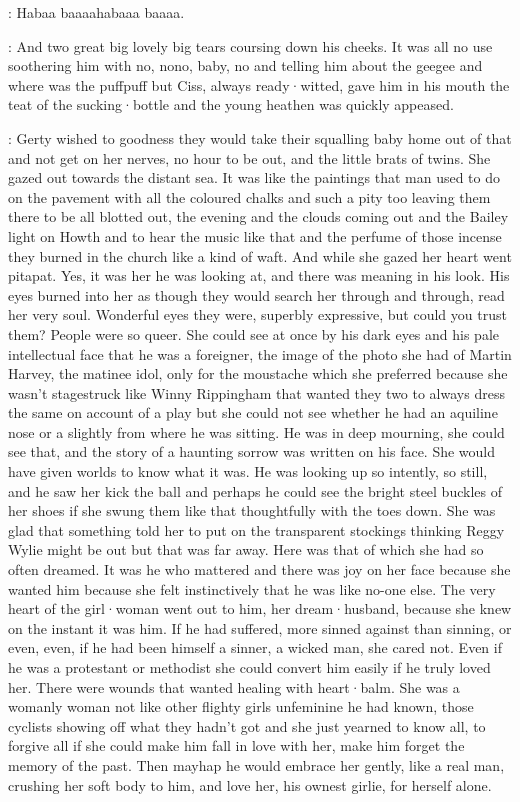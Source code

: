 \baby:
Habaa baaaahabaaa baaaa.

:
And two great big lovely big tears
coursing down his cheeks.
It was all no use
soothering him
with no, nono, baby, no
and telling him about the geegee
and where was the puffpuff
but Ciss,
always ready·witted,
gave him in his mouth
the teat of the sucking·bottle
and the young heathen was quickly appeased.

:
Gerty wished to goodness
they would take their squalling baby
home out of that
and not get on her nerves,
no hour to be out,
and the little brats of twins.
She gazed out towards the distant sea.
It was like the paintings
that man used to do on the pavement
with all the coloured chalks and such
a pity too
leaving them there
to be all blotted out,
the evening and the clouds coming out
and the Bailey light on Howth
and to hear the music like that
and the perfume of those incense
they burned in the church
like a kind of waft.
And while she gazed
her heart went pitapat.
Yes,
it was her
he was looking at,
and there was meaning in his look.
His eyes burned into her
as though they would search her
through and through,
read her very soul.
Wonderful eyes they were,
superbly expressive,
but could you trust them?
People were so queer.
She could see at once
by his dark eyes
and his pale intellectual face
that he was a foreigner,
the image of the photo
she had of Martin Harvey,
the matinee idol,
only for the moustache
which she preferred
because she wasn't stagestruck
like Winny Rippingham
that wanted they two
to always dress the same
on account of a play
but she could not see
whether he had an aquiline nose
or a slightly 
from where he was sitting.
He was in deep mourning,
she could see that,
and the story of a haunting sorrow
was written on his face.
She would have given worlds
to know what it was.
He was looking up so intently,
so still,
and he saw her kick the ball
and perhaps he could see
the bright steel buckles of her shoes
if she swung them like that
thoughtfully with the toes down.
She was glad that something told her
to put on the transparent stockings
thinking Reggy Wylie might be out
but that was far away.
Here was that
of which she had so often dreamed.
It was he who mattered
and there was joy on her face
because she wanted him
because she felt instinctively
that he was like no-one else.
The very heart of the girl·woman
went out to him,
her dream·husband,
because she knew on the instant
it was him.
If he had suffered,
more sinned against than sinning,
or even,
even,
if he had been himself a sinner,
a wicked man,
she cared not.
Even if he was a protestant or methodist
she could convert him easily
if he truly loved her.
There were wounds
that wanted healing with heart·balm.
She was a womanly woman
not like other flighty girls unfeminine
he had known,
those cyclists showing off what they hadn't got
and she just yearned to know all,
to forgive all
if she could make him
fall in love with her,
make him forget
the memory of the past.
Then mayhap
he would embrace her gently,
like a real man,
crushing her soft body to him,
and love her,
his ownest girlie,
for herself alone.

